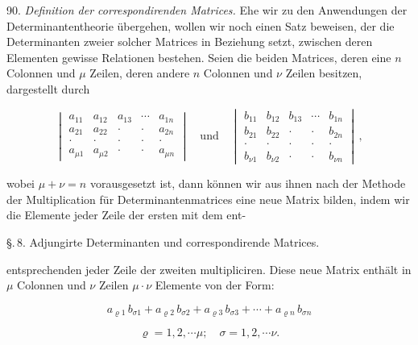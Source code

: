 \documentclass[11pt]{article}
\providecommand{\weberpage}[1]{}
\providecommand{\weq}[2]{\begin{equation}\tag{#1}#2\end{equation}}
\begin{document}
90. \textit{Definition der correspondirenden Matrices.} Ehe wir zu den Anwendungen der Determinantentheorie übergehen, wollen wir noch einen Satz beweisen, der die Determinanten zweier solcher Matrices in Beziehung setzt, zwischen deren Elementen gewisse Relationen bestehen. Seien die beiden Matrices, deren eine $n$ Colonnen und $\mu$ Zeilen, deren andere $n$ Colonnen und $\nu$ Zeilen besitzen, dargestellt durch

\[
\begin{vmatrix}
a_{11} & a_{12} & a_{13} & \cdots & a_{1n} \\
a_{21} & a_{22} & \cdot & \cdot & a_{2n} \\
\cdot & \cdot & \cdot & \cdot & \cdot \\
a_{\mu 1} & a_{\mu 2} & \cdot & \cdot & a_{\mu n}
\end{vmatrix}
\quad\text{und}\quad
\begin{vmatrix}
b_{11} & b_{12} & b_{13} & \cdots & b_{1n} \\
b_{21} & b_{22} & \cdot & \cdot & b_{2n} \\
\cdot & \cdot & \cdot & \cdot & \cdot \\
b_{\nu 1} & b_{\nu 2} & \cdot & \cdot & b_{\nu n}
\end{vmatrix}\, ,
\]

wobei $\mu + \nu = n$ vorausgesetzt ist, dann können wir aus ihnen nach der Methode der Multiplication für Determinantenmatrices eine neue Matrix bilden, indem wir die Elemente jeder Zeile der ersten mit dem ent-


\weberpage{95}
\S.\,8. Adjungirte Determinanten und correspondirende Matrices.

entsprechenden jeder Zeile der zweiten multipliciren. Diese neue Matrix enthält in $\mu$ Colonnen und $\nu$ Zeilen $\mu\cdot\nu$ Elemente von der Form:

\weq{1}{a_{\varrho 1}\, b_{\sigma 1} + a_{\varrho 2}\, b_{\sigma 2} + a_{\varrho 3}\, b_{\sigma 3} + \cdots + a_{\varrho n}\, b_{\sigma n}}

\[
\varrho = 1, 2, \cdots \mu; \quad \sigma = 1, 2, \cdots \nu.
\]
\end{document}

